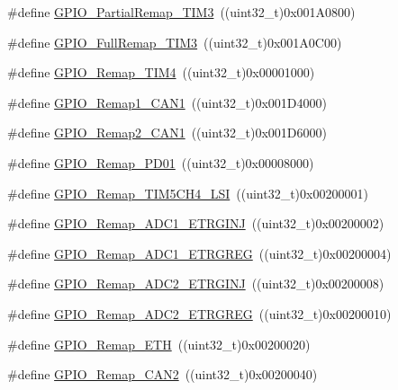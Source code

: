 \begin{DoxyCompactItemize}
\#define \hyperlink{group___g_p_i_o___remap__define_gaaced3961a038fd8b41abfaf55d24f609}{G\+P\+I\+O\+\_\+\+Partial\+Remap\+\_\+\+T\+I\+M3}~((uint32\+\_\+t)0x001\+A0800)
\item 
\#define \hyperlink{group___g_p_i_o___remap__define_ga8ba8cef32c5076db1872e173f873dae6}{G\+P\+I\+O\+\_\+\+Full\+Remap\+\_\+\+T\+I\+M3}~((uint32\+\_\+t)0x001\+A0\+C00)
\item 
\#define \hyperlink{group___g_p_i_o___remap__define_ga041b2f02b32895ce34bcd7499c9e873f}{G\+P\+I\+O\+\_\+\+Remap\+\_\+\+T\+I\+M4}~((uint32\+\_\+t)0x00001000)
\item 
\#define \hyperlink{group___g_p_i_o___remap__define_ga89ac81224968d8faf42475be664c1e09}{G\+P\+I\+O\+\_\+\+Remap1\+\_\+\+C\+A\+N1}~((uint32\+\_\+t)0x001\+D4000)
\item 
\#define \hyperlink{group___g_p_i_o___remap__define_gad4f5b46cf24bed1563b22e6ecca3ebef}{G\+P\+I\+O\+\_\+\+Remap2\+\_\+\+C\+A\+N1}~((uint32\+\_\+t)0x001\+D6000)
\item 
\#define \hyperlink{group___g_p_i_o___remap__define_gaeac44191de99d55a5fa03e29b74d5e59}{G\+P\+I\+O\+\_\+\+Remap\+\_\+\+P\+D01}~((uint32\+\_\+t)0x00008000)
\item 
\#define \hyperlink{group___g_p_i_o___remap__define_gad909488d0b7a0cfa1116a66e962e3c62}{G\+P\+I\+O\+\_\+\+Remap\+\_\+\+T\+I\+M5\+C\+H4\+\_\+\+L\+SI}~((uint32\+\_\+t)0x00200001)
\item 
\#define \hyperlink{group___g_p_i_o___remap__define_gaf79d966f49b64d3feb0ba9cc39294dac}{G\+P\+I\+O\+\_\+\+Remap\+\_\+\+A\+D\+C1\+\_\+\+E\+T\+R\+G\+I\+NJ}~((uint32\+\_\+t)0x00200002)
\item 
\#define \hyperlink{group___g_p_i_o___remap__define_gab1d040cab5d9f16f362edc2e8b47a82a}{G\+P\+I\+O\+\_\+\+Remap\+\_\+\+A\+D\+C1\+\_\+\+E\+T\+R\+G\+R\+EG}~((uint32\+\_\+t)0x00200004)
\item 
\#define \hyperlink{group___g_p_i_o___remap__define_gae00aaabeed54e805932ec6978acf000d}{G\+P\+I\+O\+\_\+\+Remap\+\_\+\+A\+D\+C2\+\_\+\+E\+T\+R\+G\+I\+NJ}~((uint32\+\_\+t)0x00200008)
\item 
\#define \hyperlink{group___g_p_i_o___remap__define_gaa782a0c482f34507c82e4cd639bb747e}{G\+P\+I\+O\+\_\+\+Remap\+\_\+\+A\+D\+C2\+\_\+\+E\+T\+R\+G\+R\+EG}~((uint32\+\_\+t)0x00200010)
\item 
\#define \hyperlink{group___g_p_i_o___remap__define_gaf578688bb4d1a17fb3a103946e7c2eb7}{G\+P\+I\+O\+\_\+\+Remap\+\_\+\+E\+TH}~((uint32\+\_\+t)0x00200020)
\item 
\#define \hyperlink{group___g_p_i_o___remap__define_ga14c09a5050063b703fa07181afc56ee6}{G\+P\+I\+O\+\_\+\+Remap\+\_\+\+C\+A\+N2}~((uint32\+\_\+t)0x00200040)

\end{DoxyCompactItemize}
